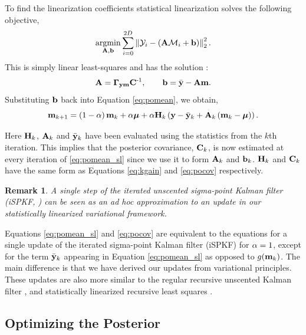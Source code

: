 \documentclass{article} %
\newtheorem{remark}{Remark}
\begin{document}
To find the linearization coefficients statistical linearization solves the
following objective,
\begin{equation}
    \argmin_{\Linmat, \intcpt} \sum^{2D}_{i=0} 
        \lnorm{2}{\Sobs_i - \brac{\Linmat\Sfunc_i + \intcpt}}^2.
\end{equation}
This is simply linear least-squares and has the solution \cite{Geist2010}:
\begin{equation}
    \Linmat = \xcov \pocov\inv, \qquad
    \intcpt = \bar\obs - \Linmat\pomean.
\end{equation}
Substituting $\intcpt$ back into Equation \eqref{eq:pomean}, we obtain, 
\begin{equation}
    \pomean_{k+1} = \brac{1-\step}\pomean_k + \step\prmean 
        + \step\Kgain_k\brac{\obs - \bar\obs_k 
        + \Linmat_k\brac{\pomean_k - \prmean}}.
    \label{eq:pomean_sl}
\end{equation}

Here $\Kgain_k$, $\Linmat_k$ and $\bar\obs_k$ have been evaluated using the
statistics from the $k$th iteration. This implies that the posterior
covariance, $\pocov_k$, is now estimated at every iteration of
\eqref{eq:pomean_sl} since we use it to form $\Linmat_k$ and $\intcpt_k$.
$\Kgain_k$ and $\pocov_k$ have the same form as Equations \eqref{eq:kgain} and
\eqref{eq:pocov} respectively. 

\begin{remark}
A single step of the  iterated unscented sigma-point Kalman filter (iSPKF,
\cite{Sibley2006}) can be seen as an ad hoc approximation to an update in our
statistically linearized variational framework. 
\end{remark}

Equations \eqref{eq:pomean_sl} and \eqref{eq:pocov} are equivalent to the
equations for a single update of the iterated sigma-point Kalman filter (iSPKF)
for $\step = 1$, except for the term $\bar\obs_k$ appearing in Equation
\eqref{eq:pomean_sl} as opposed to $\nonlin{\pomean_k}$. The main difference is
that we have derived our updates from variational principles.
%
These updates are also more similar to the regular recursive unscented Kalman
filter \cite{Julier2004}, and statistically linearized recursive least squares
\cite{Geist2010}.


\subsection{Optimizing the Posterior}
\end{document}
